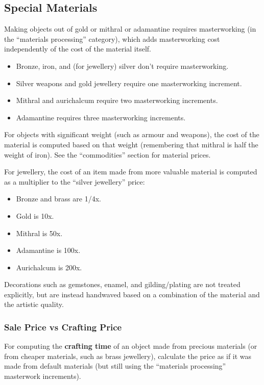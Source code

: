 %
\subsection{Special Materials}

Making objects out of gold or mithral or adamantine requires masterworking
(in the ``materials processing'' category), which adds masterworking cost
independently of the cost of the material itself.

\begin{itemize}
\item Bronze, iron, and (for jewellery) silver don't require masterworking.
\item Silver weapons and gold jewellery require one masterworking increment.
\item Mithral and aurichalcum require two masterworking increments.
\item Adamantine requires three masterworking increments.
\end{itemize}

For objects with significant weight (such as armour and weapons), the cost
of the material is computed based on that weight (remembering that mithral
is half the weight of iron). See the ``commodities'' section for material
prices.

For jewellery, the cost of an item made from more valuable material is
computed as a multiplier to the ``silver jewellery'' price:
\begin{itemize}
\item Bronze and brass are 1/4x.
\item Gold is 10x.
\item Mithral is 50x.
\item Adamantine is 100x.
\item Aurichalcum is 200x.
\end{itemize}

Decorations such as gemstones, enamel, and gilding/plating are not treated
explicitly, but are instead handwaved based on a combination of the
material and the artistic quality.

\subsubsection{Sale Price vs Crafting Price}

For computing the \textbf{crafting time} of an object made from precious
materials (or from cheaper materials, such as brass jewellery), calculate
the price as if it was made from default materials (but still using the
``materials processing'' masterwork increments).

